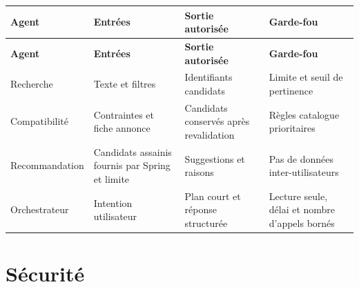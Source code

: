{\small\singlespacing{}
\begin{longtable}{|>{\raggedright\arraybackslash}p{}|>{\raggedright\arraybackslash}p{}|>{\raggedright\arraybackslash}p{}|>{\raggedright\arraybackslash}p{}|}
\hline
\rowcolor{tablehead} \color{white}\bfseries Agent & \color{white}\bfseries Entrées & \color{white}\bfseries Sortie autorisée & \color{white}\bfseries Garde-fou \\ \hline
\endfirsthead
\rowcolor{tablehead} \color{white}\bfseries Agent & \color{white}\bfseries Entrées & \color{white}\bfseries Sortie autorisée & \color{white}\bfseries Garde-fou \\ \hline
\endhead
\hline\endfoot
Recherche & Texte et filtres & Identifiants candidats & Limite et seuil de pertinence \\ \hline
\rowcolor{tablerow} Compatibilité & Contraintes et fiche annonce & Candidats conservés après revalidation & Règles catalogue prioritaires \\ \hline
Recommandation & Candidats assainis fournis par Spring et limite & Suggestions et raisons & Pas de données inter-utilisateurs \\ \hline
\rowcolor{tablerow} Orchestrateur & Intention utilisateur & Plan court et réponse structurée & Lecture seule, délai et nombre d'appels bornés \\ \hline
\end{longtable}
}


\section{Sécurité}


